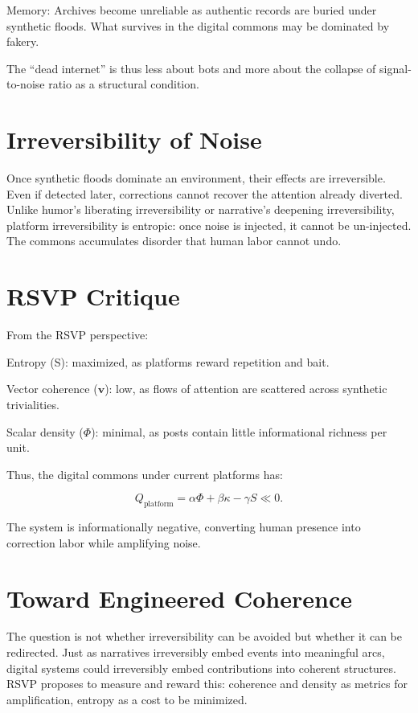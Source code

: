 \documentclass{book}
\begin{document}
Memory: Archives become unreliable as authentic records are buried under synthetic floods. What survives in the digital commons may be dominated by fakery.

The “dead internet” is thus less about bots and more about the collapse of signal-to-noise ratio as a structural condition.

\section{Irreversibility of Noise}

Once synthetic floods dominate an environment, their effects are irreversible. Even if detected later, corrections cannot recover the attention already diverted. Unlike humor’s liberating irreversibility or narrative’s deepening irreversibility, platform irreversibility is entropic: once noise is injected, it cannot be un-injected. The commons accumulates disorder that human labor cannot undo.

\section{RSVP Critique}

From the RSVP perspective:

Entropy (S): maximized, as platforms reward repetition and bait.

Vector coherence (\(\mathbf{v}\)): low, as flows of attention are scattered across synthetic trivialities.

Scalar density (\(\Phi\)): minimal, as posts contain little informational richness per unit.

Thus, the digital commons under current platforms has:

\[ Q_{\text{platform}} = \alpha \Phi + \beta \kappa - \gamma S \ll 0. \]

The system is informationally negative, converting human presence into correction labor while amplifying noise.

\section{Toward Engineered Coherence}

The question is not whether irreversibility can be avoided but whether it can be redirected. Just as narratives irreversibly embed events into meaningful arcs, digital systems could irreversibly embed contributions into coherent structures. RSVP proposes to measure and reward this: coherence and density as metrics for amplification, entropy as a cost to be minimized.
\end{document}
